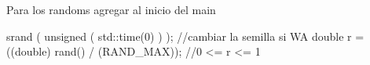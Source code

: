 Para los randoms agregar al inicio del main
\begin{code}
srand ( unsigned ( std::time(0) ) ); //cambiar la semilla si WA
double r = ((double) rand() / (RAND_MAX)); //0 <= r <= 1 
\end{code}